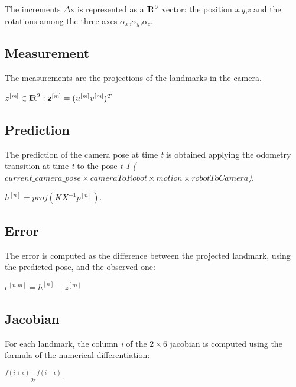 \documentclass[10pt]{article}
\begin{document}
	The increments $\Delta$x is represented as a ${\rm I\!R}^6$ vector: the position \textit{x},\textit{y},\textit{z} and the rotations among the three axes \textit{$\alpha_x$},\textit{$\alpha_y$},\textit{$\alpha_z$}.
	
	\subsection{Measurement}
	The measurements are the projections of the landmarks in the camera. \\
	\begin{center}
	$z^{[\textit{m}]} \in {\rm I\!R}^2 : \textbf{z}^{[\textit{m}]} = (u^{[\textit{m}]} v^{[\textit{m}]})^T$
	\end{center}

	\subsection{Prediction}
	The prediction of the camera pose at time \textit{t} is obtained applying the odometry transition at time \textit{t} to the pose \textit{t-1} \textit{($current\_camera\_pose \times cameraToRobot \times motion \times robotToCamera$)}. \\
			\begin{center}
	$h^{[\textit{n}]} = proj(K X^{-1} p^{[\textit{n}]})$.
	\end{center}
	
	\subsection{Error}
	The error is computed as the difference between the projected landmark, using the predicted pose, and the observed one:\\
			\begin{center}
	$e^{[\textit{n,m}]} = h^{[\textit{n}]} - z^{[\textit{m}]}$
	\end{center}
	
	\subsection{Jacobian}
	For each landmark, the column \textit{i} of the $2\times6$ jacobian is computed using the formula of the numerical differentiation: \\
			\begin{center}
$ \frac{f(i +  \epsilon) - f(i-\epsilon)}{2\epsilon}$.
\end{center}
	
\end{document}
